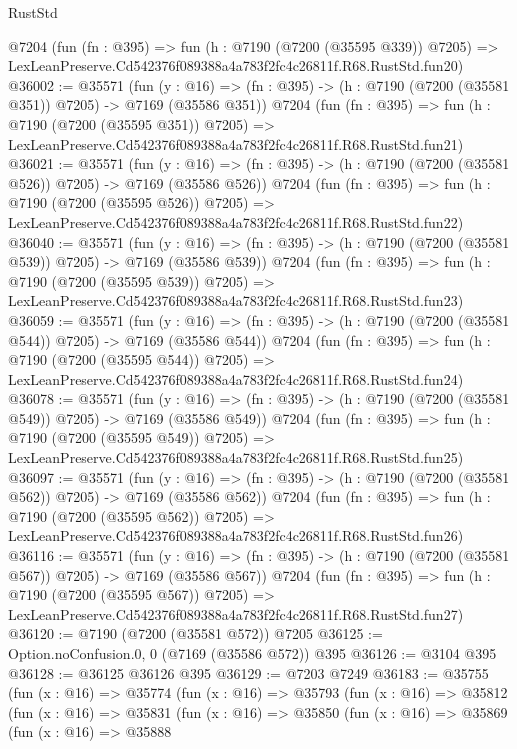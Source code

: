 \begin{lexlean}{RustStd}
\begin{coremodule}
    @7204
    (fun (fn : @395) =>
    fun (h : @7190 (@7200 (@35595 @339)) @7205) =>
    LexLeanPreserve.Cd542376f089388a4a783f2fc4c26811f.R68.RustStd.fun20)
@36002 := @35571
    (fun (y : @16) => (fn : @395) -> (h : @7190 (@7200 (@35581 @351)) @7205) -> @7169 (@35586 @351))
    @7204
    (fun (fn : @395) =>
    fun (h : @7190 (@7200 (@35595 @351)) @7205) =>
    LexLeanPreserve.Cd542376f089388a4a783f2fc4c26811f.R68.RustStd.fun21)
@36021 := @35571
    (fun (y : @16) => (fn : @395) -> (h : @7190 (@7200 (@35581 @526)) @7205) -> @7169 (@35586 @526))
    @7204
    (fun (fn : @395) =>
    fun (h : @7190 (@7200 (@35595 @526)) @7205) =>
    LexLeanPreserve.Cd542376f089388a4a783f2fc4c26811f.R68.RustStd.fun22)
@36040 := @35571
    (fun (y : @16) => (fn : @395) -> (h : @7190 (@7200 (@35581 @539)) @7205) -> @7169 (@35586 @539))
    @7204
    (fun (fn : @395) =>
    fun (h : @7190 (@7200 (@35595 @539)) @7205) =>
    LexLeanPreserve.Cd542376f089388a4a783f2fc4c26811f.R68.RustStd.fun23)
@36059 := @35571
    (fun (y : @16) => (fn : @395) -> (h : @7190 (@7200 (@35581 @544)) @7205) -> @7169 (@35586 @544))
    @7204
    (fun (fn : @395) =>
    fun (h : @7190 (@7200 (@35595 @544)) @7205) =>
    LexLeanPreserve.Cd542376f089388a4a783f2fc4c26811f.R68.RustStd.fun24)
@36078 := @35571
    (fun (y : @16) => (fn : @395) -> (h : @7190 (@7200 (@35581 @549)) @7205) -> @7169 (@35586 @549))
    @7204
    (fun (fn : @395) =>
    fun (h : @7190 (@7200 (@35595 @549)) @7205) =>
    LexLeanPreserve.Cd542376f089388a4a783f2fc4c26811f.R68.RustStd.fun25)
@36097 := @35571
    (fun (y : @16) => (fn : @395) -> (h : @7190 (@7200 (@35581 @562)) @7205) -> @7169 (@35586 @562))
    @7204
    (fun (fn : @395) =>
    fun (h : @7190 (@7200 (@35595 @562)) @7205) =>
    LexLeanPreserve.Cd542376f089388a4a783f2fc4c26811f.R68.RustStd.fun26)
@36116 := @35571
    (fun (y : @16) => (fn : @395) -> (h : @7190 (@7200 (@35581 @567)) @7205) -> @7169 (@35586 @567))
    @7204
    (fun (fn : @395) =>
    fun (h : @7190 (@7200 (@35595 @567)) @7205) =>
    LexLeanPreserve.Cd542376f089388a4a783f2fc4c26811f.R68.RustStd.fun27)
@36120 := @7190 (@7200 (@35581 @572)) @7205
@36125 := Option.noConfusion.{0, 0} (@7169 (@35586 @572)) @395
@36126 := @3104 @395
@36128 := @36125 @36126 @395
@36129 := @7203 @7249
@36183 := @35755
    (fun (x : @16) =>
    @35774
      (fun (x : @16) =>
      @35793
        (fun (x : @16) =>
        @35812
          (fun (x : @16) =>
          @35831
            (fun (x : @16) =>
            @35850
              (fun (x : @16) =>
              @35869
                (fun (x : @16) =>
                @35888

\end{coremodule}
\end{lexlean}
